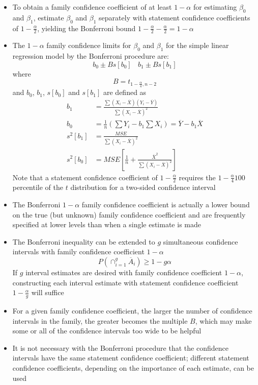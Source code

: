 \begin{itemize}
\item To obtain a family confidence coefficient of at least $1-\alpha$ for estimating $\beta_0$ and $\beta_1$, estimate $\beta_0$ and $\beta_1$ separately with statement confidence coefficients of $1- \frac{\alpha}{2}$, yielding the Bonferroni bound $1-\frac{\alpha}{2} - \frac{\alpha}{2} = 1-\alpha$
\item The $1-\alpha$ family confidence limits for $\beta_0$ and $\beta_1$ for the simple linear regression model by the Bonferroni procedure are: $$ b_0 \pm Bs[b_0] ~~~~ b_1 \pm Bs[b_1] $$ where $$ B = t_{1 - \frac{\alpha}{4}, n-2} $$ and $b_0$, $b_1$, $s[b_0]$ and $s[b_1]$ are defined as 
$$ \begin{aligned} b_1 &= \frac{\sum (X_i - \overline{X})(Y_i - \overline{Y})}{\sum (X_i - \overline{X})^2} \\ b_0 &= \frac{1}{n} \left( \sum Y_i - b_1\sum X_i\right) = \overline{Y} - b_1\overline{X} \\  
s^2[b_1] &= \frac{MSE}{\sum (X_i - \overline{X})^2} \\ s^2[b_0] &= MSE\left[\frac{1}{n} + \frac{\overline{X}^2}{\sum (X_i - \overline{X})^2}\right] \end{aligned} $$ 
Note that a statement confidence coefficient of $1-\frac{\alpha}{2}$ requires the $1-\frac{\alpha}{4}100$ percentile of the $t$ distribution for a two-sided confidence interval
\item The Bonferroni $1-\alpha$ family confidence coefficient is actually a lower bound on the true (but unknown) family confidence coefficient and are frequently specified at lower levels than when a single estimate is made
\item The Bonferroni inequality can be extended to $g$ simultaneous confidence intervals with family confidence coefficient $1-\alpha$ $$ P\left(\cap_{i=1}^g \overline{A}_i \right) \geq 1 - g\alpha $$ If $g$ interval estimates are desired with family confidence coefficient $1-\alpha$, constructing each interval estimate with statement confidence coefficient $1-\frac{\alpha}{g}$ will suffice
\item For a given family confidence coefficient, the larger the number of confidence intervals in the family, the greater becomes the multiple $B$, which may make some or all of the confidence intervals too wide to be helpful 
\item It is not necessary with the Bonferroni procedure that the confidence intervals have the same statement confidence coefficient; different statement confidence coefficients, depending on the importance of each estimate, can be used 

\end{itemize}
